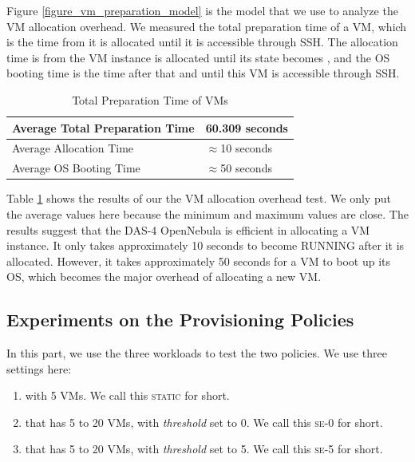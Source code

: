 Figure \ref{figure_vm_preparation_model} is the model that we use to analyze
the VM allocation overhead. We measured the total preparation time of a VM,
which is the time from it is allocated until it is accessible through
\textsc{SSH}. The allocation time is from the VM instance is
allocated until its state becomes \staterunning, and the OS booting time is
the time after that and until this VM is accessible through \textsc{SSH}.

\begin{table}
\caption{Total Preparation Time of VMs}
\label{table_vm_preparation}
\centering
\begin{tabular}{|l|l|}
\hline
Average Total Preparation Time & 60.309 seconds \\
\hline
Average Allocation Time & $\approx$10 seconds \\
\hline
Average OS Booting Time & $\approx$50 seconds \\
\hline
\end{tabular}
\end{table}

Table \ref{table_vm_preparation} shows the results of our the VM allocation
overhead test. We only put the average values here because the minimum and
maximum values are close. The results suggest that the DAS-4 OpenNebula
is efficient in allocating a VM instance. It only takes approximately 10
seconds to become RUNNING after it is allocated. However, it takes
approximately 50 seconds for a VM to boot up its OS, which becomes the major
overhead of allocating a new VM.


\newcommand{\STATIC}{\textsc{static}}
\newcommand{\SE}{\textsc{se}}
\newcommand{\SEzero}{\textsc{se-0}}
\newcommand{\SEfive}{\textsc{se-5}}

\subsection{Experiments on the Provisioning Policies}
In this part, we use the three workloads to test the two policies. We
use three settings here:
\begin{enumerate}
\item \policystatic{} with 5 VMs. We call this \STATIC{} for short.
\item \policysimpleelastic{} that has 5 to 20 VMs, with \emph{threshold} set to 0. We call this \SEzero{} for short.
\item \policysimpleelastic{} that has 5 to 20 VMs, with \emph{threshold} set to 5. We call this \SEfive{} for short.
\end{enumerate}

